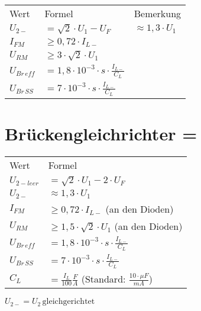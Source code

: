     \begin{table}[H]
        \begin{tabularx}{\columnwidth}{l l l}
            Wert            & Formel                                             & Bemerkung \\
            $U_{2-}$        & $=\sqrt{2}\cdot U_1-U_F$                           & $\approx 1,3\cdot U_1 $ \\
            $I_{FM}$        & $\geq 0,72\cdot I_{L-}$                            & \\
            $U_{RM}$        & $\geq 3\cdot \sqrt{2}\cdot U_1$                    & \\
            $U_{Br\, eff}$  & $=1,8\cdot 10^{-3}\cdot s\cdot\frac{I_{L-}}{C_L}$  & \\
            $U_{Br\, SS}$   & $=7\cdot 10^{-3}\cdot s\cdot\frac{I_{L-}}{C_L}$    & \\
        \end{tabularx}
    \end{table}

\section{Brückengleichrichter = }\label{sec:bruckengleichrichter}
    \begin{minipage}{0.5\columnwidth}
        \begin{table}[H]
            \begin{tabularx}{\columnwidth}{l l}
                Wert            & Formel \\
                $U_{2-leer}$    & $=\sqrt{2}\cdot U_1-2\cdot U_F$ \\
                $U_{2-}$        & $\approx 1,3\cdot U_1$ \\
                $I_{FM}$        & $\geq 0,72\cdot I_{L-}$ (an den Dioden) \\
                $U_{RM}$        & $\geq 1,5\cdot\sqrt{2}\cdot U_1$ (an den Dioden) \\
                $U_{Br\,eff}$   & $=1,8\cdot 10^{-3}\cdot s \cdot\frac{I_{L-}}{C_L}$ \\
                $U_{Br\,SS}$    & $=7\cdot 10^{-3}\cdot s \cdot\frac{I_{L-}}{C_L}$ \\
                $C_L$           & $=\frac{I_L}{100}\frac{F}{A}$ (Standard: $\frac{10\cdot\mu F}{mA}$)\\
            \end{tabularx}
        \end{table}
        $U_{2-}=U_2\,\text{gleichgerichtet}$ 
    \end{minipage}
    \begin{minipage}{0.5\columnwidth}
    \end{minipage}

